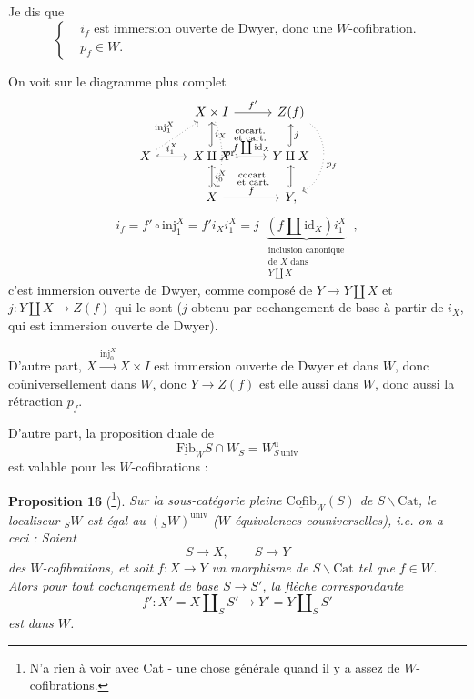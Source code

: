 \documentclass[11pt]{article}
\newcommand{\printedpage}[1]{\marginpar{\footnotesize p.~#1}}
\newcommand{\msp}[1]{\marginpar{\footnotesize [#1]}}
\begin{document}
Je dis que
\[
\left\{
\begin{aligned}
& i_f \text{ est immersion ouverte de Dwyer, donc une } W\text{-cofibration.} \\
& p_f \in W.
\end{aligned}
\right.
\]

\msp{page 230}
On voit sur le diagramme plus complet
\[
\begin{tikzcd}
& X \times I \arrow[r, "f'"] \arrow[dd, dotted, bend left=20, "\mathrm{pr}_1"] \arrow[dr, phantom, "\substack{\text{cocart.}\\ \text{et cart.}}"] & Z(f) \arrow[dd, dotted, bend left=60, "p_f"] \\
X \arrow[ur, dotted, "\mathrm{inj}_1^X"] \arrow[r, hook, "i_1^X"] & X \amalg X \arrow[u, hook, "i_X"'] \arrow[r, "f \coprod \mathrm{id}_X"] \arrow[dr, phantom, "\substack{\text{cocart.}\\ \text{et cart.}}"] & Y \amalg X \arrow[u, hook, "j"'] \\
& X \arrow[u, hook, "i_0^X"'] \arrow[r, "f"] & Y, \arrow[u, hook]
\end{tikzcd}
\]
\printedpage{147}
\[
i_f = f' \circ \mathrm{inj}_1^X = f' i_X i_1^X = j \ \ \underbrace{(f \amalg \mathrm{id}_X) i_1^X}_{\substack{\text{inclusion canonique}\\ \text{de } X \text{ dans}\\ Y \coprod X}} \ \ ,
\]
c'est immersion ouverte de Dwyer, comme composé de $Y \longrightarrow Y \amalg X$ et $j : Y \amalg X \longrightarrow Z(f)$ qui le sont ($j$ obtenu par cochangement de base à partir de $i_X$, qui est immersion ouverte de Dwyer).

D'autre part, $X \xrightarrow{\mathrm{inj}_0^X} X \times I$ est immersion ouverte de Dwyer et dans $W$, donc coüniversellement dans $W$, donc $Y \longrightarrow Z(f)$ est elle aussi dans $W$, donc aussi la rétraction $p_f$.

D'autre part, la proposition duale de
\[
\underline{\mathrm{Fib}}_W S \cap W_S = W^{\mathrm{u}}_{S\,\mathrm{univ}}
\]
est valable pour les $W$-cofibrations :

\msp{page 231}
\textbf{Proposition 16} (\footnote[125]{N'a rien à voir avec Cat - une chose générale quand il y a assez de $W$-cofibrations.}). \textit{Sur la sous-catégorie pleine $\underline{\mathrm{Cofib}}_W(S)$ de $S\backslash\mathrm{Cat}$, le localiseur ${}_SW$ est égal au $({}_SW)^{\mathrm{univ}}$ ($W$-équivalences couniverselles), i.e. on a ceci : Soient}
\[
S \longrightarrow X, \qquad S \longrightarrow Y
\]
\textit{des $W$-cofibrations, et soit $f : X \longrightarrow Y$ un morphisme de $S\backslash\mathrm{Cat}$ tel que $f \in W$. Alors pour tout cochangement de base $S \longrightarrow S'$, la flèche correspondante}
\[
f' : X' = X \amalg_S S' \longrightarrow Y' = Y \amalg_S S'
\]
\textit{est dans $W$.}
\end{document}
